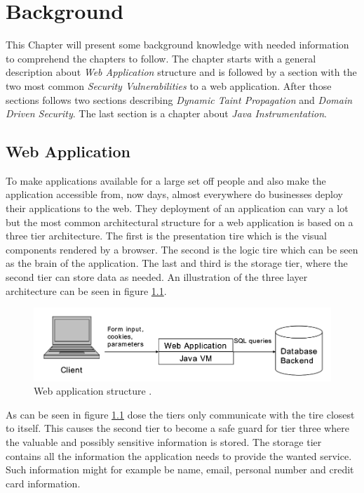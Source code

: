 \chapter{Background}
This Chapter will present some background knowledge with needed information to comprehend the chapters to follow. The chapter starts with a general description about \textit{Web Application} structure and is followed by a section with the two most common \textit{Security Vulnerabilities} to a web application. After those sections follows  two sections describing \textit{Dynamic Taint Propagation} and \textit{Domain Driven Security}. The last section is a chapter about \textit{Java Instrumentation}.


\section{Web Application}
To make applications available for a large set off people and also make the application accessible from, now days, almost everywhere do businesses deploy their applications to the web. They deployment of an application can vary a lot but the most common architectural structure for a web application is based on a three tier architecture. The first is the presentation tire which is the visual components rendered by a browser. The second is the logic tire which can be seen as the brain of the application. The last and third is the storage tier, where the second tier can store data as needed. \parencite{JustinClarke-Salt2009SIAa} An illustration of the three layer architecture can be seen in figure \ref{fig:webApplication-Haldar}.

\begin{figure}
  \centering
  \includegraphics[width=\textwidth]{images/webApplication-Haldar.png}
  \caption{Web application structure \cite{Haldar}.}
  \label{fig:webApplication-Haldar}
\end{figure}

As can be seen in figure \ref{fig:webApplication-Haldar} dose the tiers only communicate with the tire closest to itself. This causes the second tier to become a safe guard for tier three where the valuable and possibly sensitive information is stored. The storage tier contains all the information the application needs to provide the wanted service. Such information might for example be name, email, personal number and credit card information. \parencite{JustinClarke-Salt2009SIAa}


